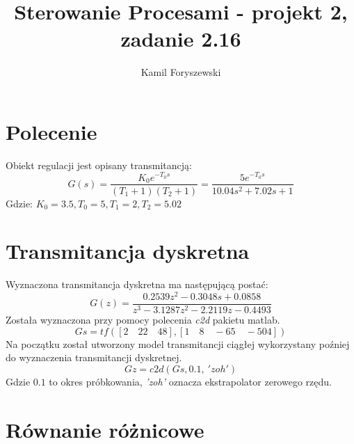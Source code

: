 \documentclass[a4paper, 11pt]{article}
\author{Kamil Foryszewski}
\title{Sterowanie Procesami - projekt 2, zadanie 2.16}
\begin{document}

\maketitle
\tableofcontents

\section{Polecenie}
Obiekt regulacji jest opisany transmitancją: 
$$G(s) = \frac{K_0e^{-T_0s}}{(T_1 + 1)(T_2+1)}  = \frac{5e^{-T_0s}}{10.04s^2+7.02s +1}  $$
Gdzie: 
$K_0 = 3.5, T_0 = 5, T_1 = 2, T_2 = 5.02$

\section{Transmitancja dyskretna}
Wyznaczona transmitancja dyskretna ma następującą postać: 
$$G(z) = \frac{0.2539z^2-0.3048s+0.0858}{z^3-3.1287z^2-2.2119z-0.4493}$$
Została wyznaczona przy pomocy polecenia \emph{c2d} pakietu matlab. 
$$Gs = tf([2\quad 22\quad 48], [1\quad 8\quad -65\quad -504])$$
Na początku został utworzony model transmitancji ciągłej wykorzystany poźniej do wyznaczenia transmitancji dyskretnej. 
$$Gz = c2d(Gs,0.1,\ 'zoh')$$
Gdzie $0.1$ to okres próbkowania, \emph{'zoh'} oznacza ekstrapolator zerowego rzędu. 
\section{Równanie różnicowe}
\end{document}
